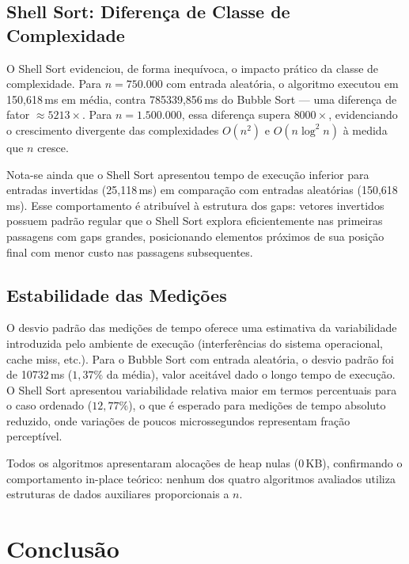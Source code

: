 \documentclass[12pt]{article}
\newcommand{\num}[1]{#1}
\begin{document}
\subsection{Shell Sort: Diferença de Classe de Complexidade}

O Shell Sort evidenciou, de forma inequívoca, o impacto prático
da classe de complexidade. Para $n = 750.000$ com entrada
aleatória, o algoritmo executou em 150,618\,ms
em média, contra 785339,856\,ms do Bubble Sort
— uma diferença de fator $\approx \num{5213}\times$. Para
$n = 1.500.000$, essa diferença supera $\num{8000}\times$,
evidenciando o crescimento divergente das complexidades
$O(n^2)$ e $O(n \log^2 n)$ à medida que $n$ cresce.

Nota-se ainda que o Shell Sort apresentou tempo de execução
inferior para entradas invertidas (25,118\,ms)
em comparação com entradas aleatórias (150,618\,ms).
Esse comportamento é atribuível à estrutura dos gaps: vetores
invertidos possuem padrão regular que o Shell Sort explora
eficientemente nas primeiras passagens com gaps grandes,
posicionando elementos próximos de sua posição final com
menor custo nas passagens subsequentes.

\subsection{Estabilidade das Medições}

O desvio padrão das medições de tempo oferece uma estimativa
da variabilidade introduzida pelo ambiente de execução
(interferências do sistema operacional, cache miss, etc.).
Para o Bubble Sort com entrada aleatória, o desvio padrão
foi de 10732\,ms ($1,37\%$ da média), valor
aceitável dado o longo tempo de execução. O Shell Sort
apresentou variabilidade relativa maior em termos percentuais
para o caso ordenado ($12,77\%$), o que é esperado para
medições de tempo absoluto reduzido, onde variações de poucos
microssegundos representam fração perceptível.

Todos os algoritmos apresentaram alocações de heap nulas
(0\,KB), confirmando o comportamento in-place
teórico: nenhum dos quatro algoritmos avaliados utiliza
estruturas de dados auxiliares proporcionais a $n$.

\section{Conclusão}
\label{sec:conclusion}
\end{document}
